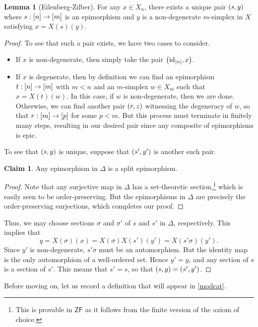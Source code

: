\documentclass[10pt,letterpaper,cm]{nupset}
\theoremstyle{definition}
\theoremstyle{theorem}
\newtheorem{lemma}[definition]{Lemma}
\newtheorem*{claim}{Claim}
\theoremstyle{remark}
\newcommand{\0}{\mathbf{0}}
\newcommand{\1}{\mathbf{1}}
\newcommand{\2}{\mathbf{2}}
\DeclareMathOperator{\idd}{id}
\newcommand{\bi}{\begin{itemize}}
\newcommand{\ei}{\end{itemize}}
\begin{document}
\begin{lemma}[Eilenberg-Zilber]\label{E-Z}
For any $x\in X_n$, there exists a unique pair $\mleft(s, y\mright)$ where $s: \mleft[n\mright] \to \mleft[m\mright]$ is an epimorphism and $y $ is a non-degenerate $m$-simplex in $X$ satisfying $x= X(s)(y)$.
\end{lemma}
\begin{proof}
To see that such a pair exists, we have two cases to consider.
\bi
\item If $x$ is non-degenerate, then simply take the pair $\mleft(\idd_{\mleft[n\mright]}, x\mright)$.
\item If $x$ is degenerate, then by definition we can find  an epimorphism $t: \mleft[n\mright] \to \mleft[m\mright]$ with $m<n$ and an $m$-simplex $w\in X_m$ such that $x= X(t)(w)$. In this case, if $w$ is non-degenerate, then we are done. Otherwise, we can find another pair $\mleft(r, z\mright)$ witnessing the degeneracy of $w$, so that $r : \mleft[m\mright] \to \mleft[p\mright]$ for some $p<m$. But this process must terminate in finitely many steps, resulting in our desired pair since any composite of epimorphisms is epic.
\ei
To see that $\mleft(s,y\mright)$ is unique, suppose that $\mleft(s', y'\mright)$ is another such pair. 
\begin{claim}
Any epimorphism in $\varDelta$ is a split epimorphism.
\end{claim}
\begin{proof}
Note that any surjective map in $\varDelta$ has a set-theoretic section,\footnote{This is provable in $\mathsf{ZF}$ as it follows from the finite version of the axiom of choice.} which is easily seen to be order-preserving. But the epimorphisms in $\varDelta$ are precisely the order-preserving surjections, which completes our proof.
\end{proof}
Thus, we may choose sections $\sigma$ and $\sigma'$ of $s$ and $s'$ in $\varDelta$, respectively.  This implies that 
\[
y = X(\sigma)(x) = X(\sigma)X(s')(y') = X(s'\sigma)(y').
\] Since $y'$ is non-degenerate, $s'{\sigma}$ must be an automorphism. But the identity map is the only  automorphism of a well-ordered set. Hence $y' = y$, and any section of $s$ is a section of $s'$. This means that $s' = s$, so that $\mleft(s, y\mright) = \mleft(s', y'\mright)$.
\end{proof}

\smallskip

Before moving on, let us record a definition that will appear in \cref{modcat}.
\end{document}
